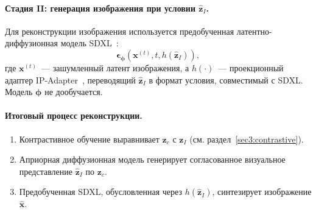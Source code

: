 \paragraph{Стадия II: генерация изображения при условии $\widehat{\mathbf{z}}_I$.}
Для реконструкции изображения используется предобученная латентно-диффузионная модель SDXL~\cite{podell2023sdxlimprovinglatentdiffusion}:
\begin{equation*}
\boldsymbol{\epsilon}_{\boldsymbol{\phi}}(\mathbf{x}^{(t)}, t, h(\widehat{\mathbf{z}}_I)),
\end{equation*}
где $\mathbf{x}^{(t)}$~--- зашумленный латент изображения, а $h(\cdot)$~--- проекционный адаптер IP-Adapter~\cite{ye2023ipadaptertextcompatibleimage}, переводящий $\widehat{\mathbf{z}}_I$ в формат условия, совместимый с SDXL. Модель $\boldsymbol{\phi}$ не дообучается.

\paragraph{Итоговый процесс реконструкции.}
\begin{enumerate}
    \item Контрастивное обучение выравнивает $\mathbf{z}_c$ с $\mathbf{z}_I$ (см. раздел~\ref{sec3:contrastive}).
    \item Априорная диффузионная модель генерирует согласованное визуальное представление $\widehat{\mathbf{z}}_I$ по $\mathbf{z}_c$.
    \item Предобученная SDXL, обусловленная через $h(\widehat{\mathbf{z}}_I)$, синтезирует изображение $\widehat{\mathbf{x}}$.
\end{enumerate}
